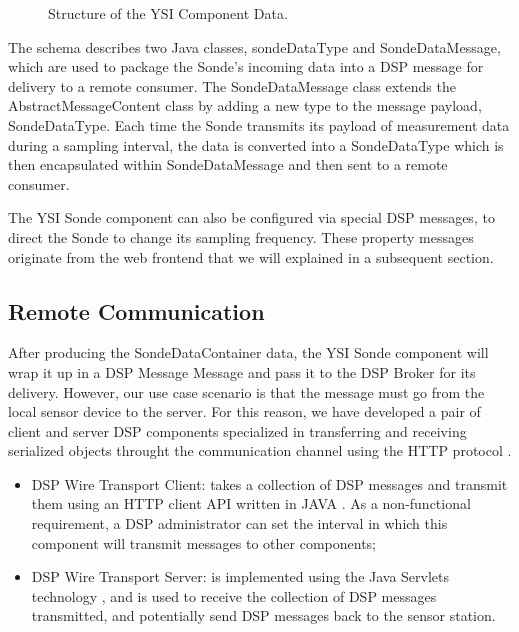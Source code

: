 \documentclass[conference]{IEEEtran}
\begin{document}
\begin{figure}[!htb]
\centering
{}
\caption{\label{FIG_DSP_YSI_DATA} Structure of the YSI Component Data.}
\end{figure}

The schema describes two Java classes, sondeDataType and
SondeDataMessage, which are used to package the Sonde's incoming data
into a DSP message for delivery to a remote consumer.  The
SondeDataMessage class extends the AbstractMessageContent class by
adding a new type to the message payload, SondeDataType.  Each time
the Sonde transmits its payload of measurement data during a sampling
interval, the data is converted into a SondeDataType which is then
encapsulated within SondeDataMessage and then sent to a remote
consumer.

The YSI Sonde component can also be configured via special DSP
messages, to direct the Sonde to change its sampling frequency.  These
property messages originate from the web frontend that we will
explained in a subsequent section.

\subsection{Remote Communication}

After producing the SondeDataContainer data, the YSI Sonde component
will wrap it up in a DSP Message Message and pass it to the DSP Broker
for its delivery.  However, our use case scenario is that the message
must go from the local sensor device to the server. For this reason,
we have developed a pair of client and server DSP components
specialized in transferring and receiving serialized objects throught
the communication channel using the HTTP protocol \cite{RFC2068}.

\begin{itemize}
\item DSP Wire Transport Client: takes a collection of DSP messages
  and transmit them using an HTTP client API written in JAVA
  \cite{http-client}. As a non-functional requirement, a DSP
  administrator can set the interval in which this component will
  transmit messages to other components;
\item DSP Wire Transport Server: is implemented using the Java
  Servlets technology \cite{java-servlets}, and is used to receive the
  collection of DSP messages transmitted, and potentially send DSP
  messages back to the sensor station.
\end{itemize}
\end{document}
